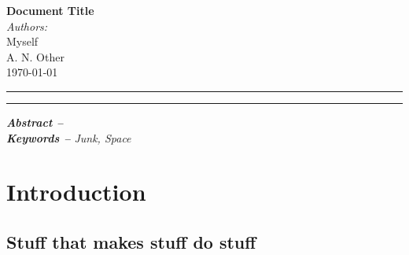 \documentclass[a4paper,10pt]{article}
\begin{document}
\begin{center}
	{ \huge \bfseries Document Title}\\[0.3cm]
	\emph{Authors:}\\
	Myself\\
	A. N. Other\\[0.5cm]
	\today\\[1.5cm]
\end{center}

\noindent\rule{\linewidth}{0.2ex}
\tableofcontents
\noindent\rule{\linewidth}{0.2ex}
\begin{multicols}{2}
\textit{\textbf{Abstract -- }}\lipsum[1]
\\[0.5cm]
\textit{\textbf{Keywords --} Junk, Space}


\section{Introduction}
\lipsum \cite{lunduke_half_2018}
\subsection{Stuff that makes stuff do stuff}
\lipsum

\end{multicols}
\printbibliography
\end{document}
